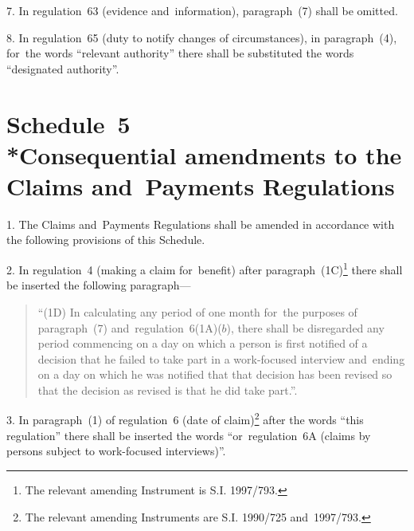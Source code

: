 \documentclass[12pt,a4paper]{article}
\begin{document}
\medskip

7.  In regulation~63 (evidence and~information), paragraph~(7) shall be omitted.

\medskip

8.  In regulation~65 (duty to notify changes of circumstances), in paragraph~(4), for~the words “relevant authority” there shall be substituted the words “designated authority”.

\part[Schedule~5 --- Consequential amendments to the Claims and~Payments Regulations]{Schedule~5\\*Consequential amendments to the Claims and~Payments Regulations}

\renewcommand\parthead{--- Schedule~5}

1.  The Claims and~Payments Regulations shall be amended in accordance with the following provisions of this Schedule.

\medskip

2.  In regulation~4 (making a claim for~benefit) after paragraph~(1C)\footnote{\frenchspacing The relevant amending Instrument is S.I. 1997/793.} there shall be inserted the following paragraph—
\begin{quotation}
“(1D) In calculating any period of one month for~the purposes of paragraph~(7) and~regulation~6(1A)($b$), there shall be disregarded any period commencing on a day on which a person is first notified of a decision that he failed to take part in a work-focused interview and~ending on a day on which he was notified that that decision has been revised so that the decision as revised is that he did take part.”.
\end{quotation}

\medskip

3.  In paragraph~(1) of regulation~6 (date of claim)\footnote{\frenchspacing The relevant amending Instruments are S.I. 1990/725 and~1997/793.} after the words “this regulation” there shall be inserted the words “or~regulation~6A (claims by persons subject to work-focused interviews)”.

\medskip
\end{document}
